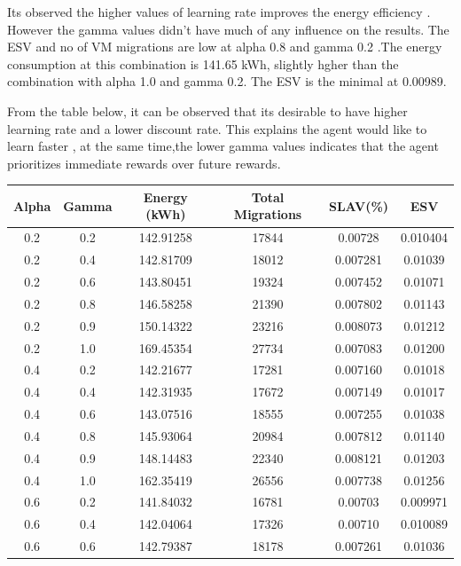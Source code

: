 \documentclass[a4paper,12pt]{Classes/RoboticsLaTeX}
\begin{document}
        Its observed the higher values of learning rate improves the energy efficiency . However the gamma values didn't have much of any influence on the results. The ESV and no of VM  migrations are low at alpha 0.8 and gamma 0.2 .The energy consumption at this combination is 141.65 kWh, slightly hgher than the combination with alpha 1.0 and gamma 0.2. The ESV is the minimal at 0.00989.

        From the table below, it can be  observed that its desirable to have higher learning rate and a lower discount rate. This explains  the agent would like to learn faster , at the same time,the lower gamma values indicates that the agent prioritizes immediate rewards over future rewards.

       \begin{table}[H]
        \centering
        \small
        \begin{tabular}{|c|c|c|c|c|c|}
        \hline
        \textbf{Alpha} & \textbf{Gamma} & \textbf{Energy (kWh)} & \textbf{Total Migrations} & \textbf{SLAV(\%)} & \textbf{ESV} \\ 
        \hline
        0.2 & 0.2 & 142.91258 & 17844 & 0.00728 & 0.010404 \\ 
        0.2 & 0.4 & 142.81709 & 18012 & 0.007281 & 0.01039 \\ 
        0.2 & 0.6 & 143.80451 & 19324 & 0.007452 & 0.01071 \\ 
        0.2 & 0.8 & 146.58258 & 21390 & 0.007802 & 0.01143 \\ 
        0.2 & 0.9 & 150.14322 & 23216 & 0.008073 & 0.01212 \\ 
        0.2 & 1.0 & 169.45354 & 27734 & 0.007083 & 0.01200 \\ 
        0.4 & 0.2 & 142.21677 & 17281 & 0.007160 & 0.01018 \\ 
        0.4 & 0.4 & 142.31935 & 17672 & 0.007149 & 0.01017 \\ 
        0.4 & 0.6 & 143.07516 & 18555 & 0.007255 & 0.01038 \\ 
        0.4 & 0.8 & 145.93064 & 20984 & 0.007812 & 0.01140 \\ 
        0.4 & 0.9 & 148.14483 & 22340 & 0.008121 & 0.01203 \\ 
        0.4 & 1.0 & 162.35419 & 26556 & 0.007738 & 0.01256 \\ 
        0.6 & 0.2 & 141.84032 & 16781 & 0.00703 & 0.009971 \\ 
        0.6 & 0.4 & 142.04064 & 17326 & 0.00710 & 0.010089 \\ 
        0.6 & 0.6 & 142.79387& 18178 & 0.007261 & 0.01036 \\ 

\end{tabular}
\end{table}
\end{document}
